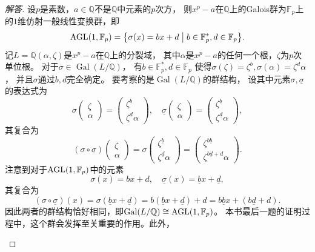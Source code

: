 \begin{enumerate}
\begin{proof}[解答]
    设$p$是素数，$a\in\mathbb{Q}$不是$\mathbb{Q}$中元素的$p$次方，
    则$x^p-a$在$\mathbb{Q}$上的Galois群为$\mathbb{F}_p$上的$1$维仿射一般线性变换群，即
    \[{\rm AGL}(1,\mathbb{F}_p)=\big\{\sigma(x)=bx+d \bigm| b\in\mathbb{F}_p^*,d\in\mathbb{F}_p\big\}.\]
    记$L=\mathbb{Q}(\alpha,\zeta)$是$x^p-a$在$\mathbb{Q}$上的分裂域，
    其中$\alpha$是$x^p-a$的任何一个根，$\zeta$为$p$次单位根。
    对于$\sigma\in\operatorname{Gal}(L/\mathbb{Q})$，
    有$b\in\mathbb{F}_p^*,d\in\mathbb{F}_p$
    使得$\sigma(\zeta)=\zeta^b,\sigma(\alpha)=\zeta^d\alpha$，
    并且$\sigma$通过$b,d$完全确定。
    要考察的是$\operatorname{Gal}(L/\mathbb{Q})$的群结构，
    设其中元素$\sigma,\underline{\sigma}$的表达式为
    \[\sigma\begin{pmatrix}\zeta\\\alpha\end{pmatrix}
    =\begin{pmatrix}\zeta^b\\\zeta^d\alpha\end{pmatrix},\quad
    \underline{\sigma}\begin{pmatrix}\zeta\\\alpha\end{pmatrix}
    =\begin{pmatrix}\zeta^{\underline{b}}\\\zeta^{\underline{d}}\alpha\end{pmatrix},\]
    其复合为
    \[(\sigma\circ\underline{\sigma})\begin{pmatrix}\zeta\\\alpha\end{pmatrix}
    =\sigma\begin{pmatrix}\zeta^{\underline{b}}\\\zeta^{\underline{d}}\alpha\end{pmatrix}
    =\begin{pmatrix}\zeta^{b\underline{b}}\\\zeta^{b\underline{d}+d}\alpha\end{pmatrix}.\]
    注意到对于${\rm AGL}(1,\mathbb{F}_p)$中的元素
    \[\sigma(x)=bx+d,\quad\underline{\sigma}(x)=\underline{b}x+\underline{d},\]
    其复合为
    \[(\sigma\circ\underline{\sigma})(x)=\sigma(\underline{b}x+\underline{d})
    =b(\underline{b}x+\underline{d})+d=b\underline{b}x+(b\underline{d}+d).\]
    因此两者的群结构恰好相同，即$\operatorname{Gal}(L/\mathbb{Q})\cong{\rm AGL}(1,\mathbb{F}_p)$。
    本书最后一题的证明过程中，这个群会发挥至关重要的作用。此外，
    \begin{itemize}

\end{itemize}
\end{proof}
\end{enumerate}
